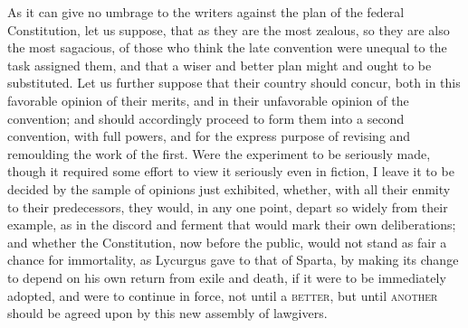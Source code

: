 As it can give no umbrage to the writers against the plan of the federal Constitution, let us suppose, that as they are the most zealous, so they are also the most sagacious, of those who think the late convention were unequal to the task assigned them, and that a wiser and better plan might and ought to be substituted. 
Let us further suppose that their country should concur, both in this favorable opinion of their merits, and in their unfavorable opinion of the convention; and should accordingly proceed to form them into a second convention, with full powers, and for the express purpose of revising and remoulding the work of the first. 
Were the experiment to be seriously made, though it required some effort to view it seriously even in fiction, I leave it to be decided by the sample of opinions just exhibited, whether, with all their enmity to their predecessors, they would, in any one point, depart so widely from their example, as in the discord and ferment that would mark their own deliberations; and whether the Constitution, now before the public, would not stand as fair a chance for immortality, as Lycurgus gave to that of Sparta, by making its change to depend on his own return from exile and death, if it were to be immediately adopted, and were to continue in force, not until a \textsc{better}, but until \textsc{another} should be agreed upon by this new assembly of lawgivers.


